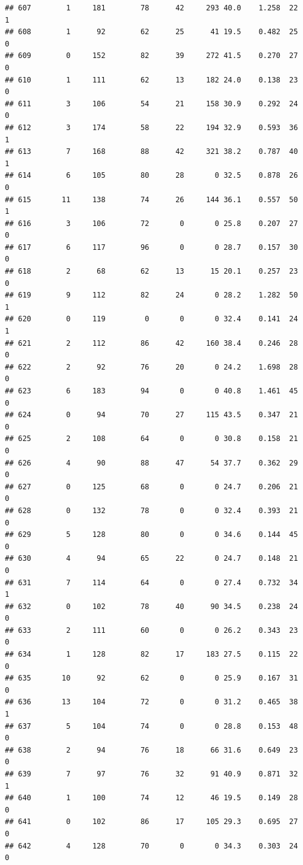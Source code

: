 \documentclass[11pt, a4paper]{article}\usepackage[]{graphicx}\usepackage[]{xcolor}
\makeatletter
\newenvironment{kframe}{%
 \def\at@end@of@kframe{}%
 \ifinner\ifhmode%
  \def\at@end@of@kframe{\end{minipage}}%
  \begin{minipage}{\columnwidth}%
 \fi\fi%
 \def\FrameCommand##1{\hskip\@totalleftmargin \hskip-\fboxsep
 \colorbox{shadecolor}{##1}\hskip-\fboxsep
     \hskip-\linewidth \hskip-\@totalleftmargin \hskip\columnwidth}%
 \MakeFramed {\advance\hsize-\width
   \@totalleftmargin\z@ \linewidth\hsize
   \@setminipage}}%
 {\par\unskip\endMakeFramed%
 \at@end@of@kframe}
\newenvironment{knitrout}{}{} %
\makeatother
\begin{document}
\begin{knitrout}
\begin{kframe}
\begin{verbatim}
## 607        1     181        78      42     293 40.0    1.258  22    1
## 608        1      92        62      25      41 19.5    0.482  25    0
## 609        0     152        82      39     272 41.5    0.270  27    0
## 610        1     111        62      13     182 24.0    0.138  23    0
## 611        3     106        54      21     158 30.9    0.292  24    0
## 612        3     174        58      22     194 32.9    0.593  36    1
## 613        7     168        88      42     321 38.2    0.787  40    1
## 614        6     105        80      28       0 32.5    0.878  26    0
## 615       11     138        74      26     144 36.1    0.557  50    1
## 616        3     106        72       0       0 25.8    0.207  27    0
## 617        6     117        96       0       0 28.7    0.157  30    0
## 618        2      68        62      13      15 20.1    0.257  23    0
## 619        9     112        82      24       0 28.2    1.282  50    1
## 620        0     119         0       0       0 32.4    0.141  24    1
## 621        2     112        86      42     160 38.4    0.246  28    0
## 622        2      92        76      20       0 24.2    1.698  28    0
## 623        6     183        94       0       0 40.8    1.461  45    0
## 624        0      94        70      27     115 43.5    0.347  21    0
## 625        2     108        64       0       0 30.8    0.158  21    0
## 626        4      90        88      47      54 37.7    0.362  29    0
## 627        0     125        68       0       0 24.7    0.206  21    0
## 628        0     132        78       0       0 32.4    0.393  21    0
## 629        5     128        80       0       0 34.6    0.144  45    0
## 630        4      94        65      22       0 24.7    0.148  21    0
## 631        7     114        64       0       0 27.4    0.732  34    1
## 632        0     102        78      40      90 34.5    0.238  24    0
## 633        2     111        60       0       0 26.2    0.343  23    0
## 634        1     128        82      17     183 27.5    0.115  22    0
## 635       10      92        62       0       0 25.9    0.167  31    0
## 636       13     104        72       0       0 31.2    0.465  38    1
## 637        5     104        74       0       0 28.8    0.153  48    0
## 638        2      94        76      18      66 31.6    0.649  23    0
## 639        7      97        76      32      91 40.9    0.871  32    1
## 640        1     100        74      12      46 19.5    0.149  28    0
## 641        0     102        86      17     105 29.3    0.695  27    0
## 642        4     128        70       0       0 34.3    0.303  24    0

\end{verbatim}
\end{kframe}
\end{knitrout}
\end{document}
